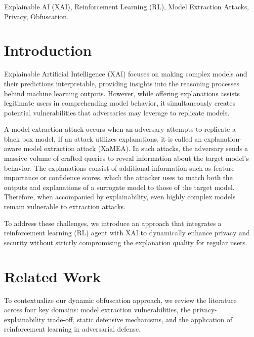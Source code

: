 \documentclass[conference]{IEEEtran}
\begin{document}
\begin{IEEEkeywords}
Explainable AI (XAI), Reinforcement Learning (RL), Model Extraction Attacks, Privacy, Obfuscation.
\end{IEEEkeywords}

\section{Introduction}
Explainable Artificial Intelligence (XAI) focuses on making complex models and their predictions interpretable, providing insights into the reasoning processes behind machine learning outputs. However, while offering explanations assists legitimate users in comprehending model behavior, it simultaneously creates potential vulnerabilities that adversaries may leverage to replicate models. 

A model extraction attack occurs when an adversary attempts to replicate a black box model. If an attack utilizes explanations, it is called an explanation-aware model extraction attack (XaMEA). In such attacks, the adversary sends a massive volume of crafted queries to reveal information about the target model's behavior. The explanations consist of additional information such as feature importance or confidence scores, which the attacker uses to match both the outputs and explanations of a surrogate model to those of the target model. Therefore,  when accompanied by explainability, even highly complex models remain vulnerable to extraction attacks.

To address these challenges, we introduce an approach that integrates a reinforcement learning (RL) agent with XAI to dynamically enhance privacy and security without strictly compromising the explanation quality for regular users.

\section{Related Work}
To contextualize our dynamic obfuscation approach, we review the literature across four key domains: model extraction vulnerabilities, the privacy-explainability trade-off, static defensive mechanisms, and the application of reinforcement learning in adversarial defense.
\end{document}
